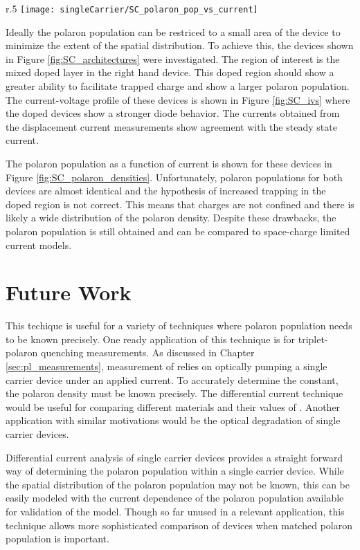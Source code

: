 \documentclass[../thesis.tex]{subfiles}
\begin{document}
\begin{wrapfigure}{r}{.5\textwidth}
    \centering%
    \texttt{[image: singleCarrier/SC\_polaron\_pop\_vs\_current]}
    \caption{Polaron population as a function of current for the devices in Figure \ref{fig:SC_architectures}}
    \label{fig:SC_polaron_densities}
\end{wrapfigure}

Ideally the polaron population can be restriced to a small area of the device to minimize the extent of the spatial distribution.  
To achieve this, the devices shown in Figure \ref{fig:SC_architectures} were investigated.
The region of interest is the mixed doped layer in the right hand device.
This doped region should show a greater ability to facilitate trapped charge and show a larger polaron population.
The current-voltage profile of these devices is shown in Figure \ref{fig:SC_ivs} where the doped devices show a stronger diode behavior.
The currents obtained from the displacement current measurements show agreement with the steady state current.

The polaron population as a function of current is shown for these devices in Figure \ref{fig:SC_polaron_densities}.
Unfortunately, polaron populations for both devices are almost identical and the hypothesis of increased trapping in the doped region is not correct.
This means that charges are not confined and there is likely a wide distribution of the polaron density.
Despite these drawbacks, the polaron population is still obtained and can be compared to space-charge limited current models.

\section{Future Work}

This techique is useful for a variety of techniques where polaron population needs to be known precisely.
One ready application of this technique is for triplet-polaron quenching measurements.
As discussed in Chapter \ref{sec:pl_measurements}, measurement of \ktp relies on optically pumping a single carrier device under an applied current.
To accurately determine the constant, the polaron density must be known precisely.
The differential current technique would be useful for comparing different materials and their values of \ktp.
Another application with similar motivations would be the optical degradation of single carrier devices.  

Differential current analysis of single carrier devices provides a straight forward way of determining the polaron population within a single carrier device.
While the spatial distribution of the polaron population may not be known, this can be easily modeled with the current dependence of the polaron population available for validation of the model.
Though so far unused in a relevant application, this technique allows more sophisticated comparison of devices when matched polaron population is important.









\end{document}
